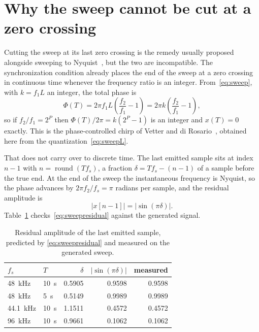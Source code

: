 \section{Why the sweep cannot be cut at a zero crossing}
Cutting the sweep at its last zero crossing is the remedy usually proposed alongside sweeping to Nyquist~\cite{Farina2007}, but the two are incompatible. The synchronization condition already places the end of the sweep at a zero crossing in continuous time whenever the frequency ratio is an integer. From~\eqref{eq:sweep}, with $k = f_1 L$ an integer, the total phase is
\begin{equation}
  \Phi(T) = 2\pi f_1 L \left( \frac{f_2}{f_1} - 1 \right)
          = 2\pi k \left( \frac{f_2}{f_1} - 1 \right),
  \label{eq:sweependphase}
\end{equation}
so if $f_2/f_1 = 2^P$ then $\Phi(T)/2\pi = k(2^P-1)$ is an integer and $x(T) = 0$ exactly. This is the phase-controlled chirp of Vetter and di Rosario~\cite{Vetter2011}, obtained here from the quantization~\eqref{eq:sweepL}.

That does not carry over to discrete time. The last emitted sample sits at index $n-1$ with $n = \operatorname{round}(T f_s)$, a fraction $\delta = T f_s - (n-1)$ of a sample before the true end. At the end of the sweep the instantaneous frequency is Nyquist, so the phase advances by $2\pi f_2/f_s = \pi$ radians per sample, and the residual amplitude is
\begin{equation}
  \bigl| x[n-1] \bigr| = \bigl| \sin(\pi\delta) \bigr|.
  \label{eq:sweepresidual}
\end{equation}
Table~\ref{tab:sweepresidual} checks~\eqref{eq:sweepresidual} against the generated signal.

\begin{table}[ht]
\centering
\caption{Residual amplitude of the last emitted sample, predicted by
\eqref{eq:sweepresidual} and measured on the generated sweep.}
\label{tab:sweepresidual}
\begin{tabular}{llrrr}
\toprule
$f_s$ & $T$ & $\delta$ & $|\sin(\pi\delta)|$ & measured \\
\midrule
\SI{48}{\kilo\hertz}   & \SI{10}{\second} & 0.5905 & 0.9598 & 0.9598 \\
\SI{48}{\kilo\hertz}   & \SI{5}{\second}  & 0.5149 & 0.9989 & 0.9989 \\
\SI{44.1}{\kilo\hertz} & \SI{10}{\second} & 1.1511 & 0.4572 & 0.4572 \\
\SI{96}{\kilo\hertz}   & \SI{10}{\second} & 0.9661 & 0.1062 & 0.1062 \\
\bottomrule
\end{tabular}
\end{table}

